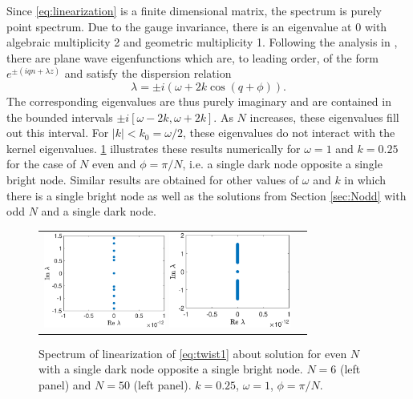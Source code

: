 \documentclass[reprint, amsmath,amssymb,aps]{revtex4-2}
\begin{document}
Since \cref{eq:linearization} is a finite dimensional matrix, the spectrum is purely point spectrum. Due to the gauge invariance, there is an eigenvalue at 0 with algebraic multiplicity 2 and geometric multiplicity 1. Following the analysis in \cite[Section 2.1.1.1]{Kevrekidis2009}, there are plane wave eigenfunctions which are, to leading order, of the form $e^{\pm( i q n + \lambda z)}$ and satisfy the dispersion relation
\begin{equation}\label{eq:dispersion}
\lambda = \pm i \left( \omega + 2 k \cos(q + \phi) \right).
\end{equation}
The corresponding eigenvalues are thus purely imaginary and are contained in the bounded intervals $\pm i[\omega - 2 k, \omega + 2 k]$. As $N$ increases, these eigenvalues fill out this interval. For $|k| < k_0 = \omega/2$, these eigenvalues do not interact with the kernel eigenvalues. \cref{fig:evenholespec} illustrates these results numerically for $\omega = 1$ and $k = 0.25$ for the case of $N$ even and $\phi = \pi/N$, i.e. a single dark node opposite a single bright node. Similar results are obtained for other values of $\omega$ and $k$ in which there is a single bright node as well as the solutions from Section \ref{sec:Nodd} with odd $N$ and a single dark node.
\begin{figure}
\begin{center}
\begin{tabular}{cc}
\includegraphics[width=4cm]{evenhole6spec.eps}
\includegraphics[width=4cm]{evenhole50spec.eps}
\end{tabular}
\end{center}
\caption{Spectrum of linearization of \cref{eq:twist1} about solution for even $N$ with a single dark node opposite a single bright node. $N=6$ (left panel) and $N=50$ (left panel). $k=0.25$, $\omega = 1$, $\phi = \pi/N$.}
\label{fig:evenholespec}
\end{figure}
\end{document}
